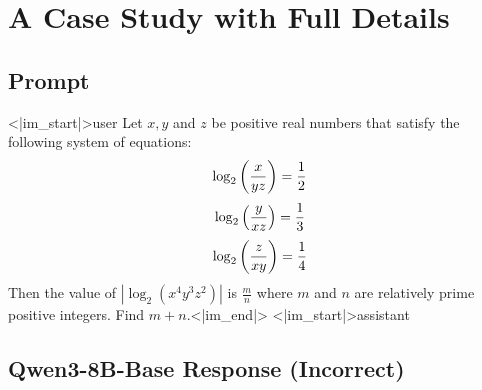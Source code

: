 \documentclass[11pt]{article}
\begin{document}
  
\appendix  

\clearpage            %


\section{A Case Study with Full Details}  
\label{appendix: example}

\subsection*{Prompt}  
  
\begin{wrappedverb}  
<|im_start|>user
Let $x,y$ and $z$ be positive real numbers that satisfy the following system of equations:
\[\log_2\left({x \over yz}\right) = {1 \over 2}\]\[\log_2\left({y \over xz}\right) = {1 \over 3}\]\[\log_2\left({z \over xy}\right) = {1 \over 4}\]
Then the value of $\left|\log_2(x^4y^3z^2)\right|$ is $\tfrac{m}{n}$ where $m$ and $n$ are relatively prime positive integers. Find $m+n$.<|im_end|>
<|im_start|>assistant
\end{wrappedverb}  
  
\subsection*{Qwen3-8B-Base Response (Incorrect)}  
  
\end{document}
